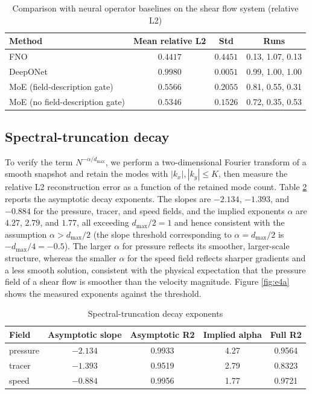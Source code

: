 \documentclass[preprint,12pt]{elsarticle}
\begin{document}
\begin{table}[t]
\centering
\small
\caption{Comparison with neural operator baselines on the shear flow system (relative L2)}
\label{tab:m2}
\begin{tabular}{lccc}
\toprule
Method & Mean relative L2 & Std & Runs \\
\midrule
FNO & $0.4417$ & $0.4451$ & 0.13, 1.07, 0.13 \\
DeepONet & $0.9980$ & $0.0051$ & 0.99, 1.00, 1.00 \\
MoE (field-description gate) & $0.5566$ & $0.2055$ & 0.81, 0.55, 0.31 \\
MoE (no field-description gate) & $0.5346$ & $0.1526$ & 0.72, 0.35, 0.53 \\
\bottomrule
\end{tabular}
\end{table}

\subsection{Spectral-truncation decay}
To verify the term $N^{-\alpha/d_{\max}}$, we perform a two-dimensional Fourier transform of a smooth snapshot and retain the modes with $|k_x|,|k_y|\le K$, then measure the relative L2 reconstruction error as a function of the retained mode count. Table \ref{tab:e4a} reports the asymptotic decay exponents. The slopes are $-2.134$, $-1.393$, and $-0.884$ for the pressure, tracer, and speed fields, and the implied exponents $\alpha$ are $4.27$, $2.79$, and $1.77$, all exceeding $d_{\max}/2=1$ and hence consistent with the assumption $\alpha>d_{\max}/2$ (the slope threshold corresponding to $\alpha=d_{\max}/2$ is $-d_{\max}/4=-0.5$). The larger $\alpha$ for pressure reflects its smoother, larger-scale structure, whereas the smaller $\alpha$ for the speed field reflects sharper gradients and a less smooth solution, consistent with the physical expectation that the pressure field of a shear flow is smoother than the velocity magnitude. Figure \ref{fig:e4a} shows the measured exponents against the threshold.

\begin{table}[t]
\centering
\small
\caption{Spectral-truncation decay exponents}
\label{tab:e4a}
\begin{tabular}{lcccc}
\toprule
Field & Asymptotic slope & Asymptotic R2 & Implied alpha & Full R2 \\
\midrule
pressure & $-2.134$ & 0.9933 & 4.27 & 0.9564 \\
tracer & $-1.393$ & 0.9519 & 2.79 & 0.8323 \\
speed & $-0.884$ & 0.9956 & 1.77 & 0.9721 \\
\bottomrule
\end{tabular}
\end{table}
\end{document}
